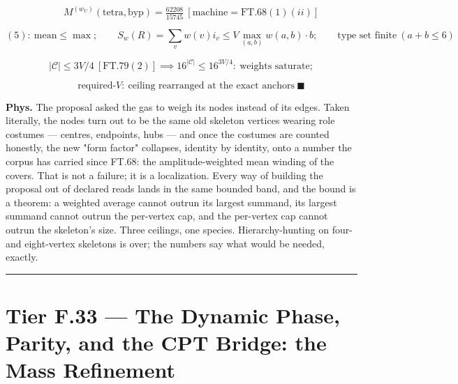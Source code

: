 \begin{theorem}
\[
\qquad M^{(w_U)}(\mathrm{tetra,byp})=\tfrac{62208}{15745}\ [\text{machine}=\mathrm{FT.68}(1)(ii)]
\]

\[
(5):\ \text{mean}\le\max;\qquad S_w(R)=\sum_vw(v)i_v\le V\max_{(a,b)}w(a,b)\cdot b;\qquad\text{type set finite}\ (a+b\le6)
\]

\[
|\mathcal C|\le3V/4\ [\mathrm{FT.79}(2)]\implies 16^{|\mathcal C|}\le16^{3V/4}:\ \text{weights saturate};
\]

\[
\qquad \text{required-}V:\ \text{ceiling rearranged at the exact anchors}\ \blacksquare
\]

\textbf{Phys.} The proposal asked the gas to weigh its nodes instead of its edges. Taken literally, the nodes turn out to be the same old skeleton vertices wearing role costumes — centres, endpoints, hubs — and once the costumes are counted honestly, the new "form factor" collapses, identity by identity, onto a number the corpus has carried since FT.68: the amplitude-weighted mean winding of the covers. That is not a failure; it is a localization. Every way of building the proposal out of declared reads lands in the same bounded band, and the bound is a theorem: a weighted average cannot outrun its largest summand, its largest summand cannot outrun the per-vertex cap, and the per-vertex cap cannot outrun the skeleton's size. Three ceilings, one species. Hierarchy-hunting on four- and eight-vertex skeletons is over; the numbers say what would be needed, exactly.

\vspace{2pt}\noindent\rule{\textwidth}{0.4pt}\vspace{2pt}

\end{theorem}

\section[Tier F.33 — The Dynamic Phase, Parity, and the CPT Bridge:…]{\texorpdfstring{Tier F.33 — The Dynamic Phase, Parity, and the CPT Bridge: the Mass Refinement}{Tier F.33 - The Dynamic Phase, Parity, and the CPT Bridge: the Mass Refinement}}

